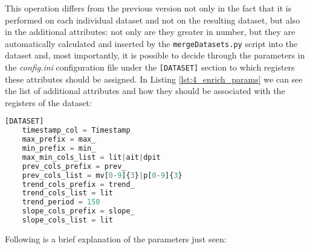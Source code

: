 This operation differs from the previous version not only in the fact that it is performed on each individual dataset and not on the resulting dataset, but also in the additional attributes: not only are they greater in number, but they are automatically calculated and inserted by the \texttt{mergeDatasets.py} script into the dataset and, most importantly, it is possible to decide through the parameters in the \textit{config.ini} configuration file under the \texttt{[DATASET]} section to which registers these attributes should be assigned. \newline
In Listing \ref{lst:4_enrich_params} we can see the list of additional attributes and how they should be associated with the registers of the dataset:

\begin{lstlisting}[language=Python,numbers=none,caption={\texttt{config.ini} parameters for dataset enriching},label=lst:4_enrich_params]
	[DATASET]
	timestamp_col = Timestamp
	max_prefix = max_
	min_prefix = min_
	max_min_cols_list = lit|ait|dpit
	prev_cols_prefix = prev_
	prev_cols_list = mv[0-9]{3}|p[0-9]{3}
	trend_cols_prefix = trend_
	trend_cols_list = lit
	trend_period = 150
	slope_cols_prefix = slope_
	slope_cols_list = lit
\end{lstlisting}
Following is a brief explanation of the parameters just seen:

